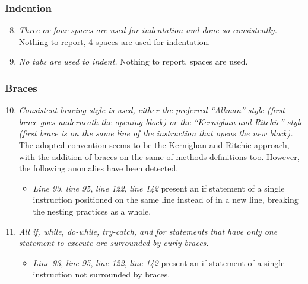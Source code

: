 	\subsubsection{Indention}
		\begin{enumerate}
			\setcounter{enumi}{7}
			\item \textit{Three or four spaces are used for indentation and done so consistently.}\newline
			Nothing to report, 4 spaces are used for indentation. %
			\item \textit{No tabs are used to indent.}\newline
			Nothing to report, spaces are used. %
		\end{enumerate}

	\subsubsection{Braces}
		\begin{enumerate}
			\setcounter{enumi}{9}
			\item \textit{Consistent bracing style is used, either the preferred “Allman” style (first brace goes underneath the opening block) or the “Kernighan and Ritchie” style (first brace is on the same line of the instruction that opens the new block).}\newline
			The adopted convention seems to be the Kernighan and Ritchie approach, with the addition of braces on the same of methods definitions too. However, the following anomalies have been detected.
			\begin{itemize}
				\item \textit{Line 93}, \textit{line 95}, \textit{line 122}, \textit{line 142} present an if statement of a single instruction positioned on the same line instead of in a new line, breaking the nesting practices as a whole.
			\end{itemize}

			\item \textit{All if, while, do-while, try-catch, and for statements that have only one statement to execute are surrounded by curly braces.}
			\begin{itemize}
				\item \textit{Line 93}, \textit{line 95}, \textit{line 122}, \textit{line 142} present an if statement of a single instruction not surrounded by braces.
			\end{itemize}
		\end{enumerate}
